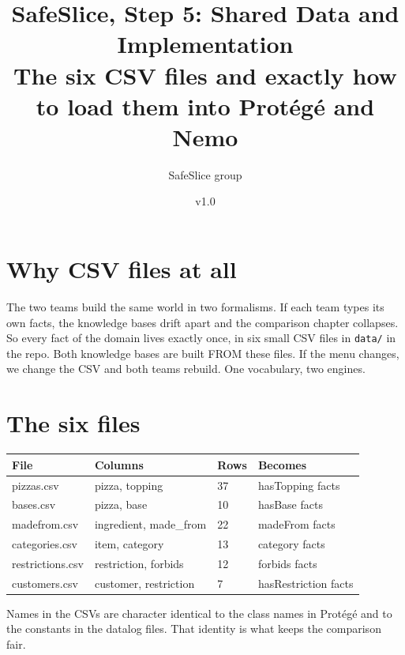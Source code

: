\documentclass[11pt,a4paper]{article}
\title{SafeSlice, Step 5: Shared Data and Implementation\\ \large The six CSV files and exactly how to load them into Prot\'eg\'e and Nemo}
\author{SafeSlice group}
\date{v1.0}
\begin{document}
\maketitle

\section{Why CSV files at all}
The two teams build the same world in two formalisms. If each team types its own facts, the knowledge bases drift apart and the comparison chapter collapses. So every fact of the domain lives exactly once, in six small CSV files in \texttt{data/} in the repo. Both knowledge bases are built FROM these files. If the menu changes, we change the CSV and both teams rebuild. One vocabulary, two engines.

\section{The six files}
\begin{tabular}{llll}
\toprule
File & Columns & Rows & Becomes\\
\midrule
pizzas.csv & pizza, topping & 37 & hasTopping facts\\
bases.csv & pizza, base & 10 & hasBase facts\\
madefrom.csv & ingredient, made\_from & 22 & madeFrom facts\\
categories.csv & item, category & 13 & category facts\\
restrictions.csv & restriction, forbids & 12 & forbids facts\\
customers.csv & customer, restriction & 7 & hasRestriction facts\\
\bottomrule
\end{tabular}

\vspace{2mm}\noindent Names in the CSVs are character identical to the class names in Prot\'eg\'e and to the constants in the datalog files. That identity is what keeps the comparison fair.
\end{document}
